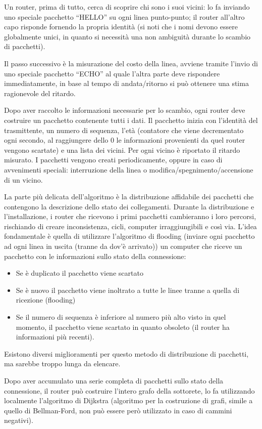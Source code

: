 Un router, prima di tutto, cerca di scoprire chi sono i suoi vicini: lo fa inviando uno speciale pacchetto “HELLO” su ogni linea punto-punto; il router all’altro capo risponde fornendo la propria identità (si noti che i nomi devono essere globalmente unici, in quanto si necessità una non ambiguità durante lo scambio di pacchetti).

Il passo successivo è la misurazione del costo della linea, avviene tramite l’invio di uno speciale pacchetto “ECHO” al quale l’altra parte deve rispondere immediatamente, in base al tempo di andata/ritorno si può ottenere una stima ragionevole del ritardo.

Dopo aver raccolto le informazioni necessarie per lo scambio, ogni router deve costruire un pacchetto contenente tutti i dati. Il pacchetto inizia con l’identità del trasmittente, un numero di sequenza, l’età (contatore che viene decrementato ogni secondo, al raggiungere dello 0 le informazioni provenienti da quel router vengono scartate) e una lista dei vicini. Per ogni vicino è riportato il ritardo misurato. I pacchetti vengono creati periodicamente, oppure in caso di avvenimenti speciali: interruzione della linea o modifica/spegnimento/accensione di un vicino.

La parte più delicata dell’algoritmo è la distribuzione affidabile dei pacchetti che contengono la descrizione dello stato dei collegamenti. Durante la distribuzione e l’installazione, i router che ricevono i primi pacchetti cambieranno i loro percorsi, rischiando di creare inconsistenza, cicli, computer irraggiungibili e così via. L’idea fondamentale è quella di utilizzare l’algoritmo di flooding (inviare ogni pacchetto ad ogni linea in uscita (tranne da dov’è arrivato)) un computer che riceve un pacchetto con le informazioni sullo stato della connessione:
\begin{itemize}
\item	Se è duplicato il pacchetto viene scartato
\item	Se è nuovo il pacchetto viene inoltrato a tutte le linee tranne a quella di ricezione (flooding)
\item	Se il numero di sequenza è inferiore al numero più alto visto in quel momento, il pacchetto viene scartato in quanto obsoleto (il router ha informazioni più recenti).
\end{itemize}
Esistono diversi miglioramenti per questo metodo di distribuzione di pacchetti, ma sarebbe troppo lunga da elencare.

Dopo aver accumulato una serie completa di pacchetti sullo stato della connessione, il router può costruire l’intero grafo della sottorete, lo fa utilizzando localmente l’algoritmo di Dijkstra (algoritmo per la costruzione di grafi, simile a quello di Bellman-Ford, non può essere però utilizzato in caso di cammini negativi).

